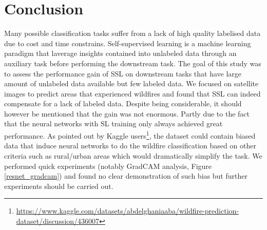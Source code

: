 \documentclass{article}
\begin{document}
\section{Conclusion}
Many possible classification tasks suffer from a lack of high quality labelised data due to cost and time constrains. Self-supervised learning is a machine learning paradigm that laverage insights contained into unlabeled data through an auxiliary task before performing the downstream task. The goal of this study was to assess the performance gain of SSL on downstream tasks that have large amount of unlabeled data available but few labeled data. We focused on satellite images to predict areas that experienced wildfires and found that SSL can indeed compensate for a lack of labeled data. Despite being considerable, it should however be mentioned that the gain was not enormous. Partly due to the fact that the neural networks with SL training only always achieved great performance. As pointed out by Kaggle users\footnote{\url{https://www.kaggle.com/datasets/abdelghaniaaba/wildfire-prediction-dataset/discussion/436007}}, the dataset could contain biased data that induce neural networks to do the wildfire classification based on other criteria such as rural/urban areas which would dramatically simplify the task. We performed quick experiments (notably GradCAM analysis, Figure \ref{resnet_gradcam}) and found no clear demonstration of such bias but further experiments should be carried out.
\end{document}
